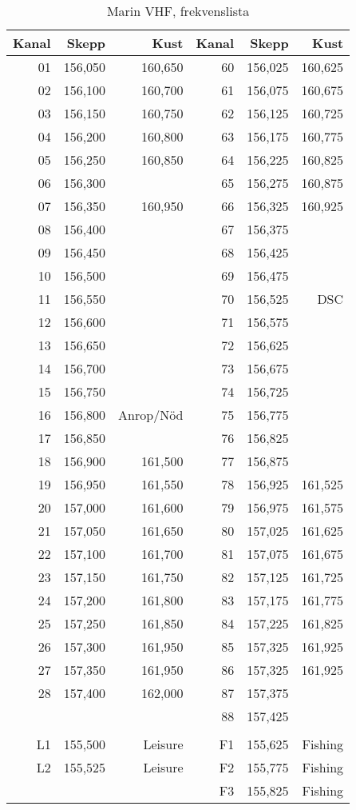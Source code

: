 \begin{table}[H]
\centering
\begin{tabular}{rrr|rrr}
\textbf{Kanal} & \textbf{Skepp} & \textbf{Kust} & \textbf{Kanal} & \textbf{Skepp} & \textbf{Kust} \\ \hline
01 & 156,050 & 160,650 & 60 & 156,025 & 160,625 \\
02 & 156,100 & 160,700 & 61 & 156,075 & 160,675 \\
03 & 156,150 & 160,750 & 62 & 156,125 & 160,725 \\
04 & 156,200 & 160,800 & 63 & 156,175 & 160,775 \\
05 & 156,250 & 160,850 & 64 & 156,225 & 160,825 \\
06 & 156,300 &         & 65 & 156,275 & 160,875 \\
07 & 156,350 & 160,950 & 66 & 156,325 & 160,925 \\
08 & 156,400 &         & 67 & 156,375 & \\
09 & 156,450 &         & 68 & 156,425 & \\
10 & 156,500 &         & 69 & 156,475 & \\
11 & 156,550 &         & 70 & 156,525 & DSC \\
12 & 156,600 &         & 71 & 156,575 & \\
13 & 156,650 &         & 72 & 156,625 & \\
14 & 156,700 &         & 73 & 156,675 & \\
15 & 156,750 &         & 74 & 156,725 & \\
16 & 156,800 & Anrop/Nöd   & 75 & 156,775 & \\
17 & 156,850 &         & 76 & 156,825 & \\
18 & 156,900 & 161,500 & 77 & 156,875 & \\
19 & 156,950 & 161,550 & 78 & 156,925 & 161,525 \\
20 & 157,000 & 161,600 & 79 & 156,975 & 161,575 \\
21 & 157,050 & 161,650 & 80 & 157,025 & 161,625 \\
22 & 157,100 & 161,700 & 81 & 157,075 & 161,675 \\
23 & 157,150 & 161,750 & 82 & 157,125 & 161,725 \\
24 & 157,200 & 161,800 & 83 & 157,175 & 161,775 \\
25 & 157,250 & 161,850 & 84 & 157,225 & 161,825 \\
26 & 157,300 & 161,950 & 85 & 157,325 & 161,925 \\
27 & 157,350 & 161,950 & 86 & 157,325 & 161,925 \\
28 & 157,400 & 162,000 & 87 & 157,375 & \\
   &         &         & 88 & 157,425 & \\
   &         &         &    &         & \\
L1 & 155,500 & Leisure        & F1 & 155,625 &Fishing \\
L2 & 155,525 & Leisure        & F2 & 155,775 &Fishing \\
   &         &         & F3 & 155,825 & Fishing\\
\end{tabular}
\caption{Marin VHF, frekvenslista}
\end{table}

